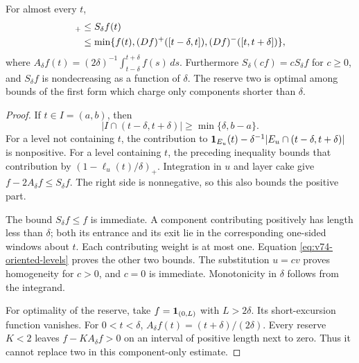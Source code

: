 \begin{theorem}
\label{thm:v74-level-bound}
For almost every $t$,
\begin{align}
 [f(t)-2A_\delta f(t)]_+
 &\le S_\delta f(t)\notag\\
 &\le\min\{f(t),(Df)^+([t-\delta,t]),
                         (Df)^-([t,t+\delta])\},\label{eq:v74-level-bound}
\end{align}
where $A_\delta f(t)=(2\delta)^{-1}\int_{t-\delta}^{t+\delta}f(s)\,ds$.
Furthermore $S_\delta(cf)=cS_\delta f$ for $c\ge0$, and $S_\delta f$
is nondecreasing as a function of $\delta$. The reserve two is optimal
among bounds of the first form which charge only components shorter
than $\delta$.
\end{theorem}
\begin{proof}
If $t\in I=(a,b)$, then
\[
 |I\cap(t-\delta,t+\delta)|\ge\min\{\delta,b-a\}.
\]
For a level not containing $t$, the contribution to
$\mathbf1_{E_u}(t)-\delta^{-1}|E_u\cap(t-\delta,t+\delta)|$ is nonpositive.
For a level containing $t$, the preceding inequality bounds that
contribution by $(1-\ell_u(t)/\delta)_+$. Integration in $u$ and
layer cake give $f-2A_\delta f\le S_\delta f$. The right side is
nonnegative, so this also bounds the positive part.

The bound $S_\delta f\le f$ is immediate. A component contributing
positively has length less than $\delta$; both its entrance and its
exit lie in the corresponding one-sided windows about $t$. Each
contributing weight is at most one. Equation
\eqref{eq:v74-oriented-levels} proves the other two bounds.
The substitution $u=cv$ proves homogeneity for $c>0$, and $c=0$
is immediate. Monotonicity in $\delta$ follows from the integrand.

For optimality of the reserve, take $f=\mathbf1_{(0,L)}$ with $L>2\delta$.
Its short-excursion function vanishes. For $0<t<\delta$,
$A_\delta f(t)=(t+\delta)/(2\delta)$. Every reserve $K<2$ leaves
$f-KA_\delta f>0$ on an interval of positive length next to zero.
Thus it cannot replace two in this component-only estimate.
\end{proof}

